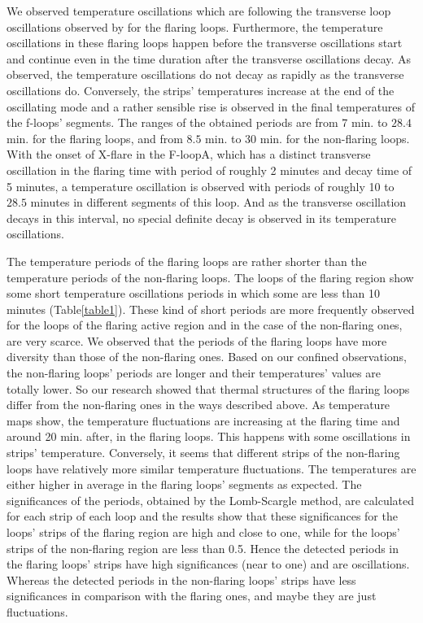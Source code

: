 \documentclass[oneside,onecolumn]{article}
\begin{document}
We observed temperature oscillations which are following the transverse loop oscillations observed by \citet{ref:Jain2015} for the flaring loops. Furthermore, the temperature oscillations in these flaring loops happen before the transverse oscillations start and continue even in the time duration after the transverse oscillations decay. As observed, the temperature oscillations do not decay as rapidly as the transverse oscillations do. Conversely, the strips' temperatures increase at the end of the oscillating mode and a rather sensible rise is observed in the final temperatures of the f-loops' segments. The ranges of the obtained periods are from 7 min. to $28.4$ min. for the flaring loops, and from $8.5$ min. to 30 min. for the non-flaring loops. With the onset of X-flare in the F-loopA, which has a distinct transverse oscillation in the flaring time with period of roughly 2 minutes and decay time of 5 minutes, a temperature oscillation is observed with periods of roughly 10 to $28.5$ minutes in different segments of this loop. And as the transverse oscillation decays in this interval, no special definite decay is observed in its temperature oscillations.

The temperature periods of the flaring loops are rather shorter than the temperature periods of the non-flaring loops. The loops of the flaring region show some short temperature oscillations periods in which some are less than 10 minutes (Table\ref{table1}). These kind of short periods are more frequently observed for the loops of the flaring active region and in the case of the non-flaring ones, are very scarce. We observed that the periods of the flaring loops have more diversity than those of the non-flaring ones. Based on our confined observations,  the non-flaring loops' periods are longer and their temperatures' values are totally lower. So our research showed that thermal structures of the flaring loops differ from the non-flaring ones in the ways described above. As temperature maps show, the temperature fluctuations are increasing at the flaring time and around 20 min. after, in the flaring loops. This happens with some oscillations in strips' temperature. Conversely, it seems that different strips of the non-flaring loops have relatively more similar temperature fluctuations. The temperatures are either higher in average in the flaring loops' segments as expected. The significances of the periods, obtained by the Lomb-Scargle method, are calculated for each strip of each loop and the results show that these significances for the loops' strips of the flaring region are high and close to one, while for the loops' strips of the non-flaring region are less than 0.5. Hence the detected periods in the flaring loops' strips have high significances (near to one) and are oscillations. Whereas the detected periods in the non-flaring loops' strips have less significances in comparison with the flaring ones, and maybe they are just fluctuations.
\end{document}
